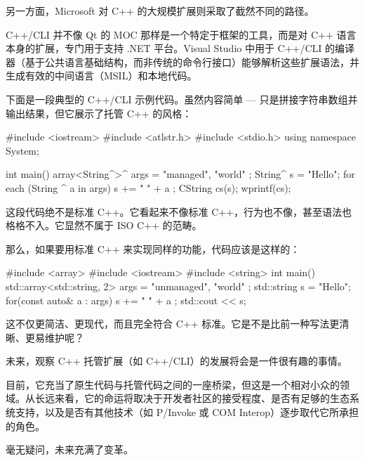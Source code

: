 另一方面，Microsoft 对 C++ 的大规模扩展则采取了截然不同的路径。

C++/CLI 并不像 Qt 的 MOC 那样是一个特定于框架的工具，而是对 C++ 语言本身的扩展，专门用于支持 .NET 平台。Visual Studio 中用于 C++/CLI 的编译器（基于公共语言基础结构，而非传统的命令行接口）能够解析这些扩展语法，并生成有效的中间语言（MSIL）和本地代码。

下面是一段典型的 C++/CLI 示例代码。虽然内容简单 --- 只是拼接字符串数组并输出结果，但它展示了托管 C++ 的风格：

\begin{cpp}
#include <iostream>
#include <atlstr.h>
#include <stdio.h>
using namespace System;

int main() {
  array<String^>^ args = { "managed", "world" };
  String^ s = "Hello";
  for each (String ^ a in args) s += " " + a ;
  CString cs(s);
  wprintf(cs);
}
\end{cpp}

这段代码绝不是标准 C++。它看起来不像标准 C++，行为也不像，甚至语法也格格不入。它显然不属于 ISO C++ 的范畴。

那么，如果要用标准 C++ 来实现同样的功能，代码应该是这样的：

\begin{cpp}
#include <array>
#include <iostream>
#include <string>
int main() {
  std::array<std::string, 2> args = { "unmanaged", "world" };
  std::string s = "Hello";
  for(const auto& a : args) {
    s += " " + a ;
  }
  std::cout << s;
}
\end{cpp}

这不仅更简洁、更现代，而且完全符合 C++ 标准。它是不是比前一种写法更清晰、更易维护呢？

未来，观察 C++ 托管扩展（如 C++/CLI）的发展将会是一件很有趣的事情。

目前，它充当了原生代码与托管代码之间的一座桥梁，但这是一个相对小众的领域。从长远来看，它的命运将取决于开发者社区的接受程度、是否有足够的生态系统支持，以及是否有其他技术（如 P/Invoke 或 COM Interop）逐步取代它所承担的角色。

毫无疑问，未来充满了变革。



















